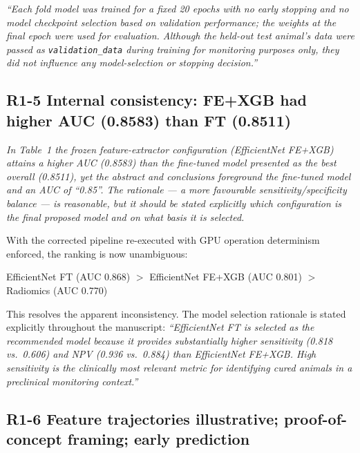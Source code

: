 \documentclass[12pt]{article}
\newcommand{\rc}[1]{\begin{reviewerbox}\itshape #1\end{reviewerbox}}
\begin{document}
\textit{``Each fold model was trained for a fixed 20 epochs with no early stopping and no model checkpoint selection based on validation performance; the weights at the final epoch were used for evaluation. Although the held-out test animal's data were passed as \texttt{validation\_data} during training for monitoring purposes only, they did not influence any model-selection or stopping decision.''}

\bigskip

\vspace{6pt}%
\subsection*{R1-5 \quad Internal consistency: FE+XGB had higher AUC (0.8583) than FT (0.8511)}

\rc{In Table~1 the frozen feature-extractor configuration (EfficientNet FE+XGB) attains a higher AUC (0.8583) than the fine-tuned model presented as the best overall (0.8511), yet the abstract and conclusions foreground the fine-tuned model and an AUC of ``0.85''. The rationale --- a more favourable sensitivity/specificity balance --- is reasonable, but it should be stated explicitly which configuration is the final proposed model and on what basis it is selected.}

With the corrected pipeline re-executed with GPU operation determinism enforced, the ranking is now unambiguous:

\begin{center}
EfficientNet FT (AUC 0.868) $>$ EfficientNet FE+XGB (AUC 0.801) $>$ Radiomics (AUC 0.770)
\end{center}

This resolves the apparent inconsistency. The model selection rationale is stated explicitly throughout the manuscript: \textit{``EfficientNet FT is selected as the recommended model because it provides substantially higher sensitivity (0.818 vs.\ 0.606) and NPV (0.936 vs.\ 0.884) than EfficientNet FE+XGB. High sensitivity is the clinically most relevant metric for identifying cured animals in a preclinical monitoring context.''}

\bigskip

\vspace{6pt}%
\subsection*{R1-6 \quad Feature trajectories illustrative; proof-of-concept framing; early prediction}
\end{document}
